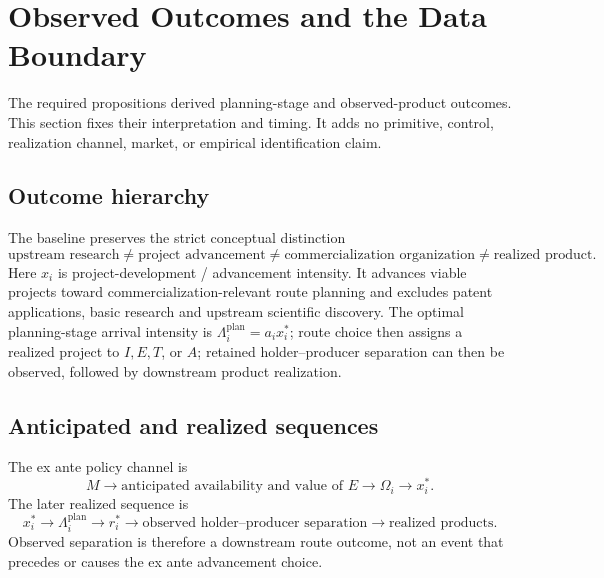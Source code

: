 \section{Observed Outcomes and the Data Boundary}
\label{sec:p09-outcomes}

The required propositions derived planning-stage and observed-product outcomes.
This section fixes their interpretation and timing. It adds no primitive, control,
realization channel, market, or empirical identification claim.

\subsection{Outcome hierarchy}
\label{subsec:p09-hierarchy}

The baseline preserves the strict conceptual distinction
\begin{equation}
  \boxed{
  \text{upstream research}
  \neq
  \text{project advancement}
  \neq
  \text{commercialization organization}
  \neq
  \text{realized product}.}
  \label{eq:p09-outcome-hierarchy}
\end{equation}
Here \(x_i\) is project-development / advancement intensity. It advances
viable projects toward commercialization-relevant route planning and excludes
patent applications, basic research and upstream scientific discovery. The optimal planning-stage arrival intensity is
\(\Lambda_i^{\mathrm{plan}}=a_ix_i^*\); route choice then assigns a realized
project to \(I,E,T\), or \(A\); retained holder--producer separation can
then be observed, followed by downstream product realization.

\subsection{Anticipated and realized sequences}
\label{subsec:p09-sequences}

The ex ante policy channel is
\begin{equation}
  M
  \longrightarrow
  \text{anticipated availability and value of }E
  \longrightarrow
  \Omega_i
  \longrightarrow
  x_i^*.
  \label{eq:p09-anticipated-chain}
\end{equation}
The later realized sequence is
\begin{equation}
  x_i^*
  \longrightarrow
  \Lambda_i^{\mathrm{plan}}
  \longrightarrow
  r_i^*
  \longrightarrow
  \text{observed holder--producer separation}
  \longrightarrow
  \text{realized products}.
  \label{eq:p09-realized-chain}
\end{equation}
Observed separation is therefore a downstream route outcome, not an event
that precedes or causes the ex ante advancement choice.

